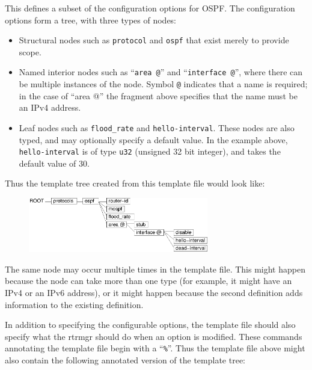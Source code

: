 \documentclass[11pt]{article}
\begin{document}
This defines a subset of the configuration options for OSPF.  The
configuration options form a tree, with three types of nodes:

\begin{itemize}

  \item Structural nodes such as {\tt protocol} and {\tt ospf} that exist
merely to provide scope.

  \item Named interior nodes such as ``{\tt area @}'' and
``{\tt interface @}'', where there can be multiple instances of the node.
Symbol {\tt @} indicates that a name is required; in the case of ``area @''
the fragment above specifies that the name must be an IPv4 address.

  \item Leaf nodes such as  {\tt flood\_rate} and
{\tt hello-interval}.  These nodes are also typed, and may optionally
specify a default value.  In the example above, {\tt hello-interval} is
of type {\tt u32} (unsigned 32 bit integer), and takes the default value of
30.

\end{itemize}

Thus the template tree created from this template file would look like:

\begin{figure}[htb]
\centerline{\includegraphics[width=0.7\textwidth]{figs/template}}
\vspace{.05in}
\end{figure}

The same node may occur multiple times in the template file.  This
might happen because the node can take more than one type (for
example, it might have an IPv4 or an IPv6 address), or it might happen
because the second definition adds information to the existing
definition.

In addition to specifying the configurable options, the template file
should also specify what the rtrmgr should do when an option is
modified.  These commands annotating the template file begin with a
``{\tt \%}''.  Thus the template file above might also contain the
following annotated version of the template tree:
\end{document}
